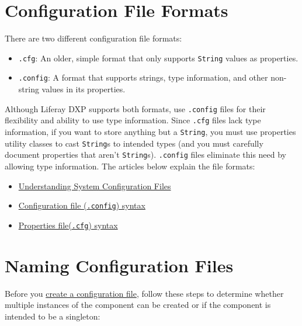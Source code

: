 \section{Configuration File Formats}\label{configuration-file-formats}

There are two different configuration file formats:

\begin{itemize}
\tightlist
\item
  \texttt{.cfg}: An older, simple format that only supports
  \texttt{String} values as properties.
\item
  \texttt{.config}: A format that supports strings, type information,
  and other non-string values in its properties.
\end{itemize}

Although Liferay DXP supports both formats, use \texttt{.config} files
for their flexibility and ability to use type information. Since
\texttt{.cfg} files lack type information, if you want to store anything
but a \texttt{String}, you must use properties utility classes to cast
\texttt{String}s to intended types (and you must carefully document
properties that aren't \texttt{String}s). \texttt{.config} files
eliminate this need by allowing type information. The articles below
explain the file formats:

\begin{itemize}
\tightlist
\item
  \href{/docs/7-1/user/-/knowledge_base/u/understanding-system-configuration-files}{Understanding
  System Configuration Files}
\item
  \href{https://sling.apache.org/documentation/bundles/configuration-installer-factory.html\#configuration-files-config}{Configuration
  file (\texttt{.config}) syntax}
\item
  \href{https://sling.apache.org/documentation/bundles/configuration-installer-factory.html\#property-files-cfg}{Properties
  file(\texttt{.cfg}) syntax}
\end{itemize}

\section{Naming Configuration Files}\label{naming-configuration-files}

Before you
\href{/docs/7-1/user/-/knowledge_base/u/creating-configuration-files}{create
a configuration file}, follow these steps to determine whether multiple
instances of the component can be created or if the component is
intended to be a singleton:

